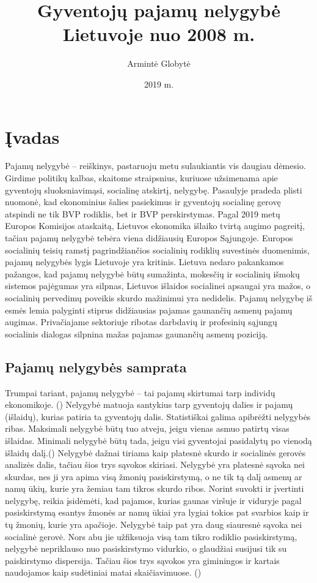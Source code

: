 \documentclass[12pt,a4paper,titlepage]{article}
\title{Gyventojų pajamų nelygybė Lietuvoje nuo 2008 m.}
\author{Armintė Globytė}
\date{2019 m.}
\begin{document}
\maketitle
\newpage
\setcounter{tocdepth}{3}
\setcounter{secnumdepth}{3}
\tableofcontents
\newpage
\section{Įvadas}
Pajamų nelygybė – reiškinys, pastaruoju metu sulaukiantis vis daugiau dėmesio. Girdime politikų kalbas, skaitome straipsnius, kuriuose užsimenama apie gyventojų sluoksniavimąsi, socialinę atskirtį, nelygybę. Pasaulyje pradeda plisti nuomonė, kad ekonominius šalies pasiekimus ir gyventojų socialinę gerovę atspindi ne tik BVP rodiklis, bet ir BVP perskirstymas. Pagal 2019 metų Europos Komisijos ataskaitą, Lietuvos ekonomika išlaiko tvirtą augimo pagreitį, tačiau pajamų nelygybė tebėra viena didžiausių Europos Sąjungoje. Europos socialinių teisių ramstį pagrindžiančios socialinių rodiklių suvestinės duomenimis, pajamų nelygybės lygis Lietuvoje yra kritinis. Lietuva nedaro pakankamos pažangos, kad pajamų nelygybė būtų sumažinta, mokesčių ir socialinių išmokų sistemos pajėgumas yra silpnas, Lietuvos išlaidos socialinei apsaugai yra mažos, o socialinių pervedimų poveikis skurdo mažinimui yra nedidelis. Pajamų nelygybę iš esmės lemia palyginti stiprus didžiausias pajamas gaunančių asmenų pajamų augimas. Privačiajame sektoriuje ribotas darbdavių ir profesinių sąjungų socialinis dialogas silpnina mažas pajamas gaunančių asmenų poziciją. 
\subsection{Pajamų nelygybės samprata}
Trumpai tariant, pajamų nelygybė – tai pajamų skirtumai tarp individų ekonomikoje. (\cite{skuvciene2008pajamku}) Nelygybė matuoja santykius tarp gyventojų dalies ir pajamų (išlaidų), kurias patiria ta gyventojų dalis. Statistiškai galima apibrėžti nelygybės ribas. Maksimali nelygybė būtų tuo atveju, jeigu vienas asmuo patirtų visas išlaidas. Minimali nelygybė būtų tada, jeigu visi gyventojai pasidalytų po vienodą išlaidų dalį.(\cite{vciulevivcius2008lietuvos}) Nelygybė dažnai tiriama kaip platesnė skurdo ir socialinės gerovės analizės dalis, tačiau šios trys sąvokos skiriasi. Nelygybė yra platesnė sąvoka nei skurdas, nes ji yra apima visą žmonių pasiskirstymą, o ne tik tą dalį asmenų ar namų ūkių, kurie yra žemiau tam tikros skurdo ribos. Norint suvokti ir įvertinti nelygybę, reikia įsidėmėti, kad pajamos, kurias gaunas viršuje ir viduryje pagal pasiskirstymą esantys žmonės ar namų ūkiai yra lygiai tokios pat svarbios kaip ir tų žmonių, kurie yra apačioje. Nelygybė taip pat yra daug siauresnė sąvoka nei socialinė gerovė. Nors abu jie užfiksuoja visą tam tikro rodiklio pasiskirstymą, nelygybė nepriklauso nuo pasiskirstymo vidurkio, o glaudžiai susijusi tik su paiskirstymo dispersija. Tačiau šios trys sąvokos yra giminingos ir kartais naudojamos kaip sudėtiniai matai skaičiavimuose. (\cite{litchfield1999inequality}) 
\end{document}
